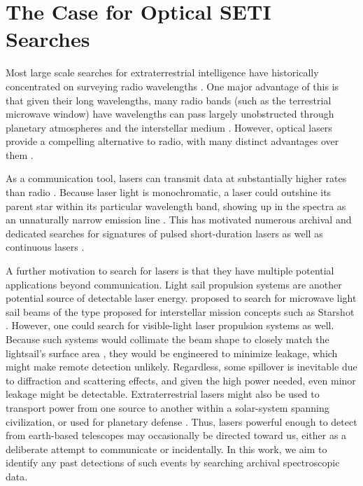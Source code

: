 \documentclass[twocolumn]{aastex701}
\begin{document}
\section{The Case for Optical SETI Searches}
Most large scale searches for extraterrestrial intelligence have historically concentrated on surveying radio wavelengths \citep{Gray_2017,OZMAII,LAMPTON1992189,Price_2020,PeterMa,Wright_2018}. One major advantage of this is that given their long wavelengths, many radio bands (such as the terrestrial microwave window) have wavelengths can pass largely unobstructed through planetary atmospheres and the interstellar medium \citep{COCCONI_MORRISON_1959}. However, optical lasers provide a compelling alternative to radio, with many distinct advantages over them \citep{caseforopticalseti}. 

As a communication tool, lasers can transmit data at substantially higher rates than radio \citep{Tellis_2017,Kingsley}. %
Because laser light is monochromatic, a laser could outshine its parent star within its particular wavelength band, showing up in the spectra as an unnaturally narrow emission line \citep{TOWNES_SCHWARTZ_1961,STANTON201992}. This has motivated numerous archival and dedicated searches for signatures of pulsed short-duration lasers \citep{Shelley_Wright,Howard_2004,Maire_2019} as well as continuous lasers \citep{Tellis_2017,Lipman_2019,Zuckerman_2023,Reines_2002,Marcy_2021}.

A further motivation to search for lasers is that they have multiple potential applications beyond communication. Light sail propulsion systems are another potential source of detectable laser energy. \cite{Guillochon_2015} proposed to search for microwave light sail beams of the type proposed for interstellar mission concepts such as Starshot \citep{STARSHOT}. However, one could search for visible-light laser propulsion systems as well. Because such systems would collimate the beam shape to closely match the lightsail's surface area \citep{STARSHOT}, they would be engineered to minimize leakage, which might make remote detection unlikely. Regardless, some spillover is inevitable due to diffraction and scattering effects, and given the high power needed, even minor leakage might be detectable.  Extraterrestrial lasers might also be used to transport power from one source to another within a solar-system spanning civilization, or used for planetary defense \citep{Bible_Johansson_Hughes_Lubin_2013}. Thus, lasers powerful enough to detect from earth-based telescopes may occasionally be directed toward us, either as a deliberate attempt to communicate or incidentally. In this work, we aim to identify any past detections of such events by searching archival spectroscopic data.
\end{document}
